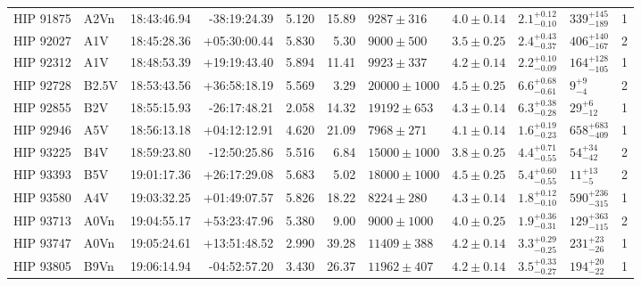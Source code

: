\begin{landscape}
\begin{scriptsize}
\begin{longtable}{|l|lrrrrlllll|}
   HIP 91875 &     A2Vn &    18:43:46.94 &   -38:19:24.39 &   5.120 &     15.89 &    $9287 \pm 316$ &  $4.0 \pm 0.14$ &  $2.1^{+0.12}_{-0.10}$ &   $339^{+145}_{-189}$ &       1 \\
   HIP 92027 &      A1V &    18:45:28.36 &   +05:30:00.44 &   5.830 &      5.30 &    $9000 \pm 500$ &  $3.5 \pm 0.25$ &  $2.4^{+0.43}_{-0.37}$ &   $406^{+140}_{-167}$ &       2 \\
   HIP 92312 &      A1V &    18:48:53.39 &   +19:19:43.40 &   5.894 &     11.41 &    $9923 \pm 337$ &  $4.2 \pm 0.14$ &  $2.2^{+0.10}_{-0.09}$ &   $164^{+128}_{-105}$ &       1 \\
   HIP 92728 &    B2.5V &    18:53:43.56 &   +36:58:18.19 &   5.569 &      3.29 &  $20000 \pm 1000$ &  $4.5 \pm 0.25$ &  $6.6^{+0.68}_{-0.61}$ &         $9^{+9}_{-4}$ &       2 \\
   HIP 92855 &      B2V &    18:55:15.93 &   -26:17:48.21 &   2.058 &     14.32 &   $19192 \pm 653$ &  $4.3 \pm 0.14$ &  $6.3^{+0.38}_{-0.28}$ &       $29^{+6}_{-12}$ &       1 \\
   HIP 92946 &      A5V &    18:56:13.18 &   +04:12:12.91 &   4.620 &     21.09 &    $7968 \pm 271$ &  $4.1 \pm 0.14$ &  $1.6^{+0.19}_{-0.23}$ &   $658^{+683}_{-409}$ &       1 \\
   HIP 93225 &      B4V &    18:59:23.80 &   -12:50:25.86 &   5.516 &      6.84 &  $15000 \pm 1000$ &  $3.8 \pm 0.25$ &  $4.4^{+0.71}_{-0.55}$ &      $54^{+34}_{-42}$ &       2 \\
   HIP 93393 &      B5V &    19:01:17.36 &   +26:17:29.08 &   5.683 &      5.02 &  $18000 \pm 1000$ &  $4.5 \pm 0.25$ &  $5.4^{+0.60}_{-0.55}$ &       $11^{+13}_{-5}$ &       2 \\
   HIP 93580 &      A4V &    19:03:32.25 &   +01:49:07.57 &   5.826 &     18.22 &    $8224 \pm 280$ &  $4.3 \pm 0.14$ &  $1.8^{+0.12}_{-0.10}$ &   $590^{+236}_{-315}$ &       1 \\
   HIP 93713 &     A0Vn &    19:04:55.17 &   +53:23:47.96 &   5.380 &      9.00 &   $9000 \pm 1000$ &  $4.0 \pm 0.25$ &  $1.9^{+0.36}_{-0.31}$ &   $129^{+363}_{-115}$ &       2 \\
   HIP 93747 &     A0Vn &    19:05:24.61 &   +13:51:48.52 &   2.990 &     39.28 &   $11409 \pm 388$ &  $4.2 \pm 0.14$ &  $3.3^{+0.29}_{-0.25}$ &     $231^{+23}_{-26}$ &       1 \\
   HIP 93805 &     B9Vn &    19:06:14.94 &   -04:52:57.20 &   3.430 &     26.37 &   $11962 \pm 407$ &  $4.2 \pm 0.14$ &  $3.5^{+0.33}_{-0.27}$ &     $194^{+20}_{-22}$ &       1 \\

\end{longtable}
\end{scriptsize}
\end{landscape}
